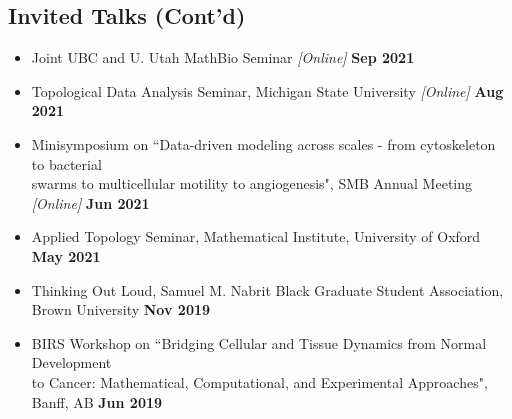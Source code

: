 \documentclass[margin,line]{res}
\begin{document}
\begin{resume}
\section{\sc Invited Talks (Cont'd)}
{\renewcommand\leftmargini{0em}
\begin{itemize}
\setlength\itemsep{0.3em}
\item[] Joint UBC and U. Utah MathBio Seminar \textit{[Online]} \hfill {\bf \small Sep 2021}
\item[] Topological Data Analysis Seminar, Michigan State University \textit{[Online]} \hfill {\bf \small Aug 2021}
\item[] Minisymposium on ``Data-driven modeling across scales - from cytoskeleton to bacterial\\ 
swarms to multicellular motility to angiogenesis", SMB Annual Meeting \textit{[Online]} \hfill {\bf \small Jun 2021}
\item[] Applied Topology Seminar, Mathematical Institute, University of Oxford \hfill {\bf \small May 2021}
\item[] Thinking Out Loud, Samuel M. Nabrit Black Graduate Student Association, \\ Brown University \hfill {\bf \small Nov 2019}
\item[] BIRS Workshop on ``Bridging Cellular and Tissue Dynamics from Normal Development\\ 
to Cancer: Mathematical, Computational, and Experimental Approaches", Banff, AB \hfill {\bf \small Jun 2019} 
\end{itemize}
}


\end{resume}
\end{document}
